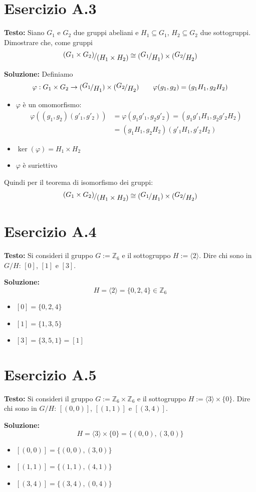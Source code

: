 \documentclass[a4paper,12pt]{article}
\newcommand{\esercizio}[2]{%
    \textbf{Testo:}
    #1
    
    \vspace{1.5em}
    
    \textbf{Soluzione:}
    #2
}
\def\nicefrac#1#2{     
    \raise.5ex\hbox{$#1$}    
    \kern-.1em/\kern-.05em     
    \lower.5ex\hbox{$#2$}
}
\begin{document}
\section*{Esercizio A.3}
\esercizio{%
    Siano $G_1$ e $G_2$ due gruppi abeliani e $H_1 \subseteq G_1$, $H_2 \subseteq G_2$ due sottogruppi. Dimostrare che, come gruppi
    \[
        \nicefrac{(G_1 \times G_2)}{(H_1 \times H_2)} \cong (\nicefrac{G_1}{H_1}) \times (\nicefrac{G_2}{H_2})
    \]
}{%
    Definiamo
    \[
        \varphi: G_1 \times G_2 \to (\nicefrac{G_1}{H_1}) \times (\nicefrac{G_2}{H_2}) \qquad \varphi(g_1,g_2) = (g_1H_1, g_2H_2)
    \]

    \begin{itemize}
        \item $\varphi$ è un omomorfismo:
              \begin{align*}
                  \varphi((g_1,g_2)(g'_1,g'_2)) & = \varphi(g_1g'_1,g_2g'_2) = (g_1g'_1H_1,g_2g'_2H_2) \\
                                                & = (g_1H_1,g_2H_2)(g'_1H_1,g'_2H_2)
              \end{align*}
        \item $\ker(\varphi) = H_1 \times H_2$
        \item $\varphi$ è suriettivo
    \end{itemize}
    Quindi per il teorema di isomorfismo dei gruppi:
    \[
        \nicefrac{(G_1 \times G_2)}{(H_1 \times H_2)} \cong (\nicefrac{G_1}{H_1}) \times (\nicefrac{G_2}{H_2})
    \]
}

\section*{Esercizio A.4}
\esercizio{%
    Si consideri il gruppo $G := \mathbb{Z}_6$ e il sottogruppo $H := \langle2\rangle$. Dire chi sono in $G/H$: $[0]$, $[1]$ e $[3]$.
}{%
    \[
        H = \langle2\rangle = \{0,2,4\} \in \mathbb{Z}_6
    \]
    \begin{itemize}
        \item $[0] = \{0,2,4\}$
        \item $[1] = \{1,3,5\}$
        \item $[3] = \{3,5,1\} = [1]$
    \end{itemize}
}

\section*{Esercizio A.5}
\esercizio{%
    Si consideri il gruppo $G := \mathbb{Z}_6 \times \mathbb{Z}_6$ e il sottogruppo $H := \langle3\rangle \times \{0\}$. Dire chi sono in $G/H$: $[(0,0)]$, $[(1,1)]$ e $[(3,4)]$.
}{%
    \[
        H = \langle3\rangle \times \{0\} = \{(0,0),(3,0)\}
    \]
    \begin{itemize}
        \item $[(0,0)] = \{(0,0),(3,0)\}$
        \item $[(1,1)] = \{(1,1),(4,1)\}$
        \item $[(3,4)] = \{(3,4),(0,4)\}$
    \end{itemize}
}
\end{document}
